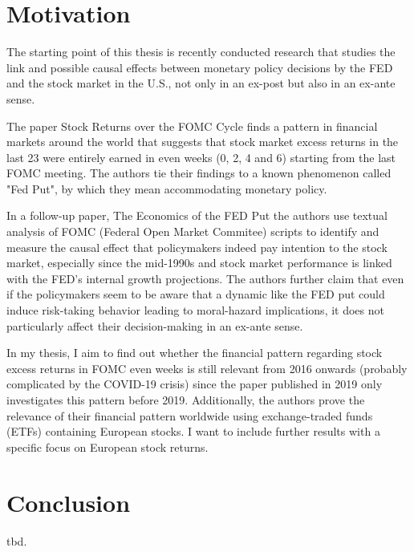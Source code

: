 
\chapter{Motivation}

The starting point of this thesis is recently conducted research that studies the link and possible causal effects between monetary policy decisions by the FED and the stock market in the U.S., not only in an ex-post but also in an ex-ante sense.

The paper Stock Returns over the FOMC Cycle \parencite{cieslak_stock_2019} finds a pattern in financial markets around the world that suggests that stock market excess returns in the last 23 were entirely earned in even weeks (0, 2, 4 and 6) starting from the last FOMC meeting. The authors tie their findings to a known phenomenon called "Fed Put", by which they mean accommodating monetary policy.

In a follow-up paper, The Economics of the FED Put \parencite{cieslak_economics_2021} the authors use textual analysis of FOMC (Federal Open Market Commitee) scripts to identify and measure the causal effect that policymakers indeed pay intention to the stock market, especially since the mid-1990s and stock market performance is linked with the FED’s internal growth projections. The authors further claim that even if the policymakers seem to be aware that a dynamic like the FED put could induce risk-taking behavior leading to moral-hazard implications, it does not particularly affect their decision-making in an ex-ante sense.

In my thesis, I aim to find out whether the financial pattern regarding stock excess returns in FOMC even weeks is still relevant from 2016 onwards (probably complicated by the COVID-19 crisis) since the paper published in 2019 only investigates this pattern before 2019. Additionally, the authors prove the relevance of their financial pattern worldwide using exchange-traded funds (ETFs) containing European stocks. I want to include further results with a specific focus on European stock returns.






%

\chapter{Conclusion}

tbd.

